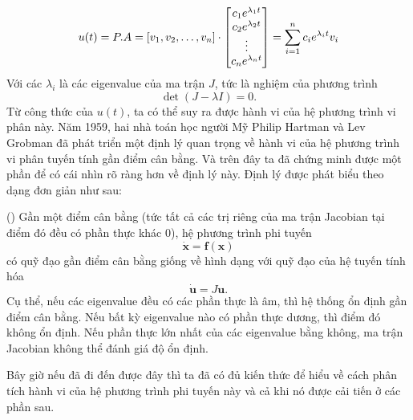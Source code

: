 \documentclass[12pt]{scrartcl}
\begin{document}
\[
    \ra u(t) = P.A = [v_1,v_2,\ldots,v_n]\cdot \begin{bmatrix}
    c_1 e^{\lambda_1 t} \\ c_2 e^{\lambda_2 t} \\ \vdots \\ c_n e^{\lambda_n t} 
\end{bmatrix}= \sum_{i = 1}^n c_i e^{\lambda_i t} v_i
\]
Với các $\lambda_i$ là các eigenvalue của ma trận $J$, tức là nghiệm của phương trình 
\[
    \det(J - \lambda I) = 0.
\]
Từ công thức của $u(t)$, ta có thể suy ra được hành vi của hệ phương trình vi phân này. Năm 1959, hai nhà toán học người Mỹ Philip Hartman và Lev Grobman đã phát triển một định lý quan trọng về hành vi của hệ phương trình vi phân tuyến tính gần điểm cân bằng. Và trên đây ta đã chứng minh được một phần để có cái nhìn rõ ràng hơn về định lý này. Định lý được phát biểu theo dạng đơn giản như sau:
\begin{theorem}()
Gần một điểm cân bằng (tức tất cả các trị riêng của ma trận Jacobian tại điểm đó đều có phần thực khác $0$), hệ phương trình phi tuyến
\[
\dot{\mathbf{x}} = \mathbf{f}(\mathbf{x})
\]
có quỹ đạo gần điểm cân bằng giống về hình dạng với quỹ đạo của hệ tuyến tính hóa
\[
\dot{\mathbf{u}} = J\mathbf{u}.
\]
Cụ thể, nếu các eigenvalue đều có các phần thực là âm, thì hệ thống ổn định gần điểm cân bằng. Nếu bất kỳ eigenvalue nào có phần thực dương, thì điểm đó không ổn định. Nếu phần thực lớn nhất của các eigenvalue bằng không, ma trận Jacobian không thể đánh giá độ ổn định.
\end{theorem}

Bây giờ nếu đã đi đến được đây thì ta đã có đủ kiến thức để hiểu về cách phân tích hành vi của hệ phương trình phi tuyến này và cả khi nó được cải tiến ở các phần sau.
\end{document}
